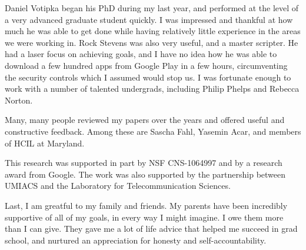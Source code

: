 Daniel Votipka began his PhD during my last year, and performed at the
level of a very advanced graduate student quickly. I was impressed and
thankful at how much he was able to get done while having relatively
little experience in the areas we were working in. Rock Stevens was
also very useful, and a master scripter. He had a laser focus on
achieving goals, and I have no idea how he was able to download a few
hundred apps from Google Play in a few hours, circumventing the
security controls which I assumed would stop us. I was fortunate
enough to work with a number of talented undergrads, including Philip
Phelps and Rebecca Norton.

Many, many people reviewed my papers over the years and offered useful
and constructive feedback. Among these are Sascha Fahl, Yasemin Acar,
and members of HCIL at Maryland.

This research was supported in part by NSF CNS-1064997 and by a
research award from Google. The work was also supported by the
partnership between UMIACS and the Laboratory for Telecommunication
Sciences.

Last, I am greatful to my family and friends. My parents have been
incredibly supportive of all of my goals, in every way I might
imagine. I owe them more than I can give. They gave me a lot of life
advice that helped me succeed in grad school, and nurtured an
appreciation for honesty and self-accountability.



